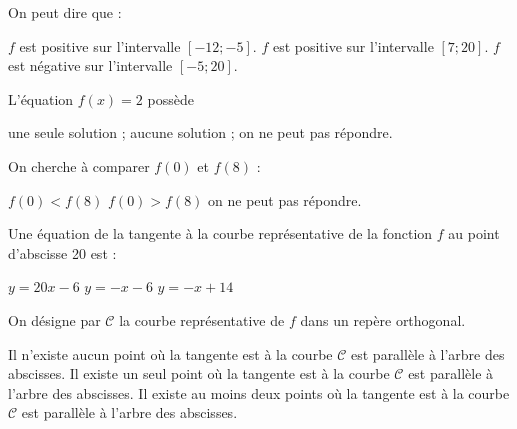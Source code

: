 \begin{questions}
	\question[1] On peut dire que :
	
		\begin{oneparcheckboxes}
			\choice $f$ est positive sur l'intervalle $[-12; -5]$.
			\choice $f$ est positive sur l'intervalle $[7; 20]$.
			\correctchoice $f$ est négative sur l'intervalle $[-5; 20]$.
		\end{oneparcheckboxes}
	
		
	\question[1] L'équation $f(x)=2$ possède 
	
	\begin{oneparcheckboxes}
		
		\correctchoice une seule solution ;
		\choice aucune solution ; 
		\choice on ne peut pas répondre.
	\end{oneparcheckboxes}	


	\question[1] On cherche à comparer $f(0)$ et $f(8)$ :
	
	\begin{oneparcheckboxes}
		
		
		\choice $f(0) < f(8)$
		\choice $f(0) > f(8)$
		\correctchoice on ne peut pas répondre.
	\end{oneparcheckboxes}

	\question[1] Une équation de la tangente à la courbe représentative de la fonction $f$ au point d'abscisse 20 est :
	
	\begin{oneparcheckboxes}
		
		
		\choice $y = 20x - 6$
		\choice $y = -x - 6$
		\correctchoice $y = -x + 14$
	\end{oneparcheckboxes}

	\question[1] On désigne par $\mathcal{C}$ la courbe représentative de $f$ dans un repère orthogonal.
	
	\begin{oneparcheckboxes}
		
		\choice Il n'existe aucun point où la tangente est à la courbe $\mathcal{C}$ est parallèle à l'arbre des abscisses.
		\choice Il existe un seul point où la tangente est à la courbe $\mathcal{C}$ est parallèle à l'arbre des abscisses.
		\correctchoice Il existe au moins deux points où la tangente est à la courbe $\mathcal{C}$ est parallèle à l'arbre des abscisses.
	\end{oneparcheckboxes}	
\end{questions}